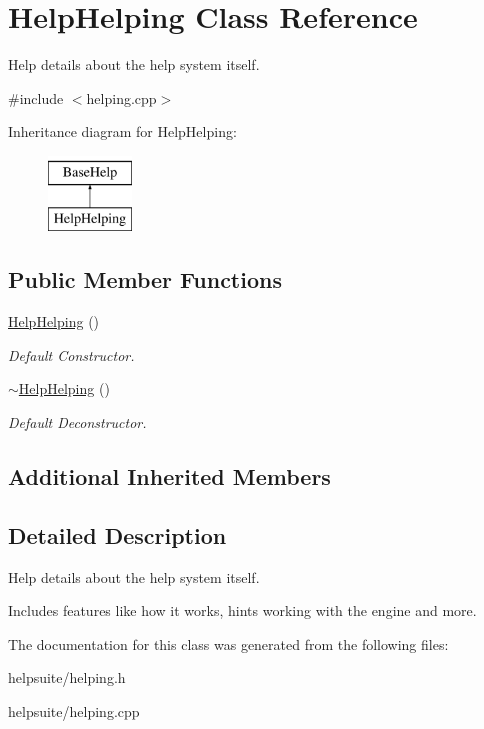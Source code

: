 \hypertarget{classHelpHelping}{}\section{Help\+Helping Class Reference}
\label{classHelpHelping}


Help details about the help system itself.  




{\ttfamily \#include $<$helping.\+cpp$>$}

Inheritance diagram for Help\+Helping\+:\begin{figure}[H]
\begin{center}
\leavevmode
\includegraphics[height=2.000000cm]{classHelpHelping}
\end{center}
\end{figure}
\subsection*{Public Member Functions}
\begin{DoxyCompactItemize}
\item 
\mbox{\label{classHelpHelping_affdb9eb8f28f990c1c61fe66a95a68d8}} 
\mbox{\hyperlink{classHelpHelping_affdb9eb8f28f990c1c61fe66a95a68d8}{Help\+Helping}} ()
\begin{DoxyCompactList}\small\item\em Default Constructor. \end{DoxyCompactList}\item 
\mbox{\label{classHelpHelping_af2fb8c57ee830114069548a27bbca106}} 
\mbox{\hyperlink{classHelpHelping_af2fb8c57ee830114069548a27bbca106}{$\sim$\+Help\+Helping}} ()
\begin{DoxyCompactList}\small\item\em Default Deconstructor. \end{DoxyCompactList}\end{DoxyCompactItemize}
\subsection*{Additional Inherited Members}


\subsection{Detailed Description}
Help details about the help system itself. 

Includes features like how it works, hints working with the engine and more. 

The documentation for this class was generated from the following files\+:\begin{DoxyCompactItemize}
\item 
helpsuite/helping.\+h\item 
helpsuite/helping.\+cpp\end{DoxyCompactItemize}
